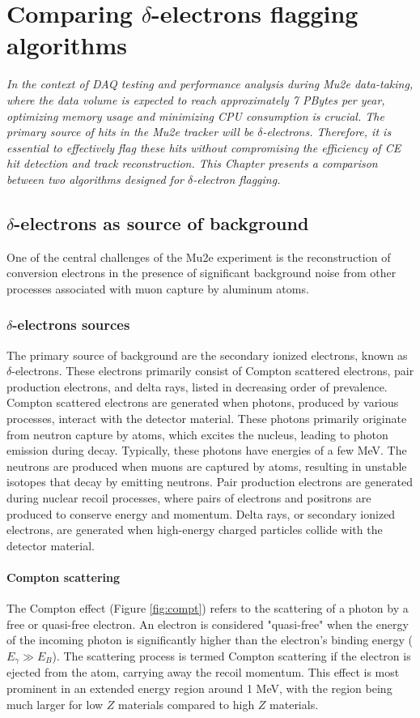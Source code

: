 \chapter{Comparing $\delta$-electrons flagging algorithms}\label{delta}
\textit{In the context of DAQ testing and performance analysis during Mu2e data-taking, 
where the data volume is expected to reach approximately 7 PBytes per year, optimizing 
memory usage and minimizing CPU consumption is crucial. The primary source of hits in the 
Mu2e tracker will be $\delta$-electrons. Therefore, it is essential to effectively flag these 
hits without compromising the efficiency of CE hit detection and track reconstruction. This 
Chapter presents a comparison between two algorithms designed for $\delta$-electron flagging.}
\section{$\delta$-electrons as source of background}
One of the central challenges of the Mu2e experiment is the reconstruction of 
conversion electrons in the presence of significant background noise from 
other processes associated with muon capture by aluminum atoms.
\subsection{$\delta$-electrons sources}
The primary source of background are the secondary ionized electrons, known as $\delta$-electrons. 
These electrons primarily consist of Compton scattered electrons, pair production 
electrons, and delta rays, listed in decreasing order of prevalence. Compton 
scattered electrons are generated when photons, produced by various processes, 
interact with the detector material. These photons primarily originate from 
neutron capture by atoms, which excites the nucleus, leading to photon emission 
during decay. Typically, these photons have energies of a few MeV. The neutrons 
are produced when muons are captured by atoms, resulting in unstable isotopes that 
decay by emitting neutrons. Pair production electrons are generated during nuclear 
recoil processes, where pairs of electrons and positrons are produced to conserve 
energy and momentum. Delta rays, or secondary ionized electrons, are generated when 
high-energy charged particles collide with the detector material.

\subsubsection{Compton scattering}
The Compton effect (Figure \ref{fig:compt}) refers to the 
scattering of a photon by a free or quasi-free electron. 
An electron is considered "quasi-free" when the energy of 
the incoming photon is significantly higher than the 
electron's binding energy ($E_\gamma \gg E_B$). The 
scattering process is termed Compton scattering if the 
electron is ejected from the atom, carrying away the 
recoil momentum. This effect is most prominent in an 
extended energy region around 1 MeV, with the region 
being much larger for low $Z$ materials compared to high $Z$ materials.

